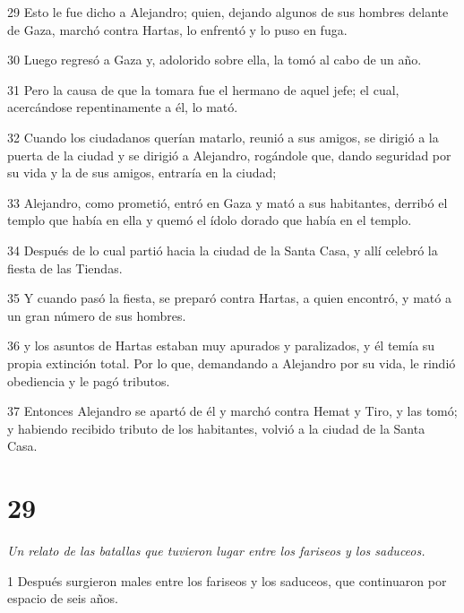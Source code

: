 \par 29 Esto le fue dicho a Alejandro; quien, dejando algunos de sus hombres delante de Gaza, marchó contra Hartas, lo enfrentó y lo puso en fuga.

\par 30 Luego regresó a Gaza y, adolorido sobre ella, la tomó al cabo de un año.

\par 31 Pero la causa de que la tomara fue el hermano de aquel jefe; el cual, acercándose repentinamente a él, lo mató.

\par 32 Cuando los ciudadanos querían matarlo, reunió a sus amigos, se dirigió a la puerta de la ciudad y se dirigió a Alejandro, rogándole que, dando seguridad por su vida y la de sus amigos, entraría en la ciudad;

\par 33 Alejandro, como prometió, entró en Gaza y mató a sus habitantes, derribó el templo que había en ella y quemó el ídolo dorado que había en el templo.

\par 34 Después de lo cual partió hacia la ciudad de la Santa Casa, y allí celebró la fiesta de las Tiendas.

\par 35 Y cuando pasó la fiesta, se preparó contra Hartas, a quien encontró, y mató a un gran número de sus hombres.

\par 36 y los asuntos de Hartas estaban muy apurados y paralizados, y él temía su propia extinción total. Por lo que, demandando a Alejandro por su vida, le rindió obediencia y le pagó tributos.

\par 37 Entonces Alejandro se apartó de él y marchó contra Hemat y Tiro, y las tomó; y habiendo recibido tributo de los habitantes, volvió a la ciudad de la Santa Casa.

\chapter{29}

\par \textit{Un relato de las batallas que tuvieron lugar entre los fariseos y los saduceos.}

\par 1 Después surgieron males entre los fariseos y los saduceos, que continuaron por espacio de seis años.

